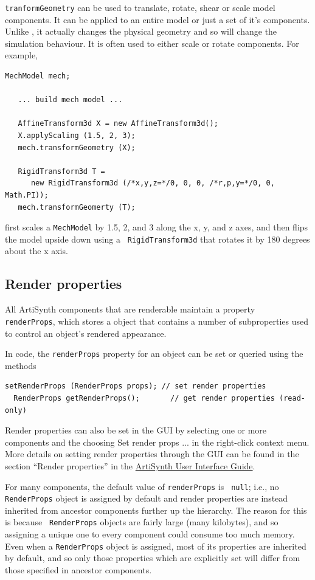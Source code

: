 {\tt tranformGeometry} can be used to translate, rotate, shear or
scale model components. It can be applied to an entire model or just a
set of it's components. Unlike
, it
actually changes the physical geometry and so will change the
simulation behaviour. It is often used to either scale or rotate
components. For example,
%
\begin{lstlisting}[]
   MechModel mech;

   ... build mech model ...

   AffineTransform3d X = new AffineTransform3d();
   X.applyScaling (1.5, 2, 3);
   mech.transformGeometry (X);
   
   RigidTransform3d T = 
      new RigidTransform3d (/*x,y,z=*/0, 0, 0, /*r,p,y=*/0, 0, Math.PI));
   mech.transformGeomerty (T);
\end{lstlisting}
%
first scales a {\tt MechModel} by 1.5, 2, and 3 along the x, y, and z
axes, and then flips the model upside down using a {\tt
RigidTransform3d} that rotates it by 180 degrees about the x axis.

\subsection{Render properties}
\label{RenderProperties:sec}

All ArtiSynth components that are renderable maintain a property {\tt
renderProps}, which stores a
 object that contains a number
of subproperties used to control an object's rendered appearance.

In code, the {\tt renderProps} property for an object can be set or
queried using the methods
%
\begin{lstlisting}[]
  setRenderProps (RenderProps props); // set render properties
  RenderProps getRenderProps();       // get render properties (read-only)
\end{lstlisting}
%
Render properties can also be set in the GUI by selecting one or more
components and the choosing {\sf Set render props ...}  in the
right-click context menu. More details on setting render properties
through the GUI can be found in the section ``Render properties'' in the
\href{../uiguide/uiguide.html}{
ArtiSynth User Interface Guide}.

For many components, the default value of {\tt renderProps} is {\tt
null}; i.e., no {\tt RenderProps} object is assigned by default and
render properties are instead inherited from ancestor components
further up the hierarchy. The reason for this is because {\tt
RenderProps} objects are fairly large (many kilobytes), and so
assigning a unique one to every component could consume too much
memory. Even when a {\tt RenderProps} object is assigned, most of its
properties are inherited by default, and so only those properties
which are explicitly set will differ from those specified in ancestor
components.

